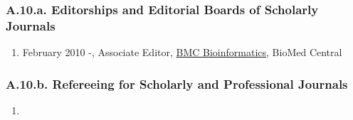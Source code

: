 
\subsubsection*{A.10.a. Editorships and Editorial Boards of Scholarly Journals}


\begin{enumerate}
  \item February 2010 -, Associate Editor, \underline{BMC Bioinformatics}, BioMed Central
\end{enumerate}

\subsubsection*{A.10.b. Refereeing for Scholarly and Professional Journals}
\begin{enumerate}
  \item                
\end{enumerate}

